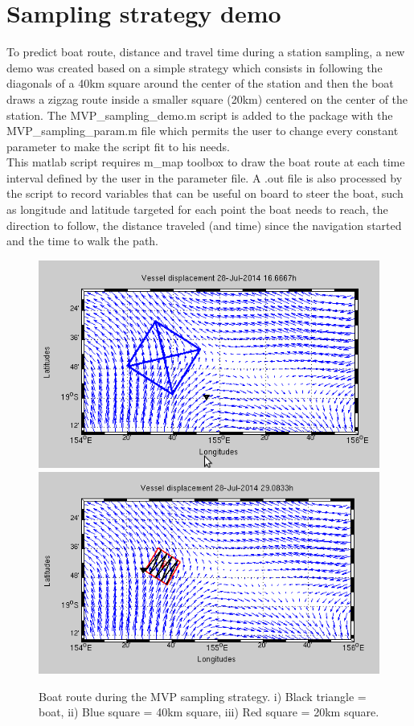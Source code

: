 \documentclass[12pt,a4paper]{article}
\begin{document}
\section{Sampling strategy demo}
To predict boat route, distance and travel time during a station sampling, a new demo was created based on a simple strategy which consists in following the diagonals of a 40km square around the center of the station and then the boat draws a zigzag route inside a smaller square (20km) centered on the center of the station. The MVP\_sampling\_demo.m script is added to the package with the MVP\_sampling\_param.m file which permits the user to change every constant parameter to make the script fit to his needs.\\
This matlab script requires m\_map toolbox to draw the boat route at each time interval defined by the user in the parameter file. A .out file is also processed by the script to record variables that can be useful on board to steer the boat, such as longitude and latitude targeted for each point the boat needs to reach, the direction to follow, the distance traveled (and time) since the navigation started and the time to walk the path.
\begin{figure}[h!] 
\begin{center}
\includegraphics[scale=0.4]{Figures/mvp_sampling_demo.png}
\includegraphics[scale=0.4]{Figures/mvp_sampling_demo2.png}
\caption{Boat route during the MVP sampling strategy. i) Black triangle = boat, ii) Blue square = 40km square, iii) Red square = 20km square.}
\end{center}
\end{figure}
\end{document}
